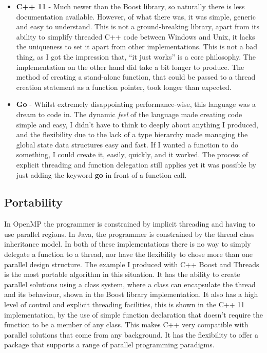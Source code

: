 \documentclass[11pt]{article} %
\begin{document}
\begin{itemize}
\item {\bf C++ 11} - Much newer than the Boost library, so naturally there is less documentation available. However, of what there was, it was simple, generic and easy to understand. This is not a ground-breaking library, apart from its ability to simplify threaded C++ code between Windows and Unix, it lacks the uniqueness to set it apart from other implementations. This is not a bad thing, as I got the impression that, ``it just works'' is a core philosophy. The implementation on the other hand did take a bit longer to produce. The method of creating a stand-alone function, that could be passed to a thread creation statement as a function pointer, took longer than expected.
\item {\bf Go} - Whilst extremely disappointing performance-wise, this language was a dream to code in. The dynamic {\it feel} of the language made creating code simple and easy, I didn't have to think to deeply about anything I produced, and the flexibility due to the lack of a type hierarchy made managing the global state data structures easy and fast. If I wanted a function to do something, I could create it, easily, quickly, and it worked. The process of explicit threading and function delegation still applies yet it was possible by just adding the keyword {\bf go} in front of a function call. 
\end{itemize}
\subsection{Portability}
In OpenMP the programmer is constrained by implicit threading and having to use parallel regions. In Java, the programmer is constrained by the thread class inheritance model. In both of these implementations there is no way to simply delegate a function to a thread, nor have the flexibility to chose more than one parallel design structure. The example I produced with C++ Boost and Threads is the most portable algorithm in this situation. It has the ability to create parallel solutions using a class system, where a class can encapsulate the thread and its behaviour, shown in the Boost library implementation. It also has a high level of control and explicit threading facilities, this is shown in the C++ 11 implementation, by the use of simple function declaration that doesn't require the function to be a member of any class. This makes C++ very compatible with parallel solutions that come from any background. It has the flexibility to offer a package that supports a range of parallel programming paradigms.
\end{document}
